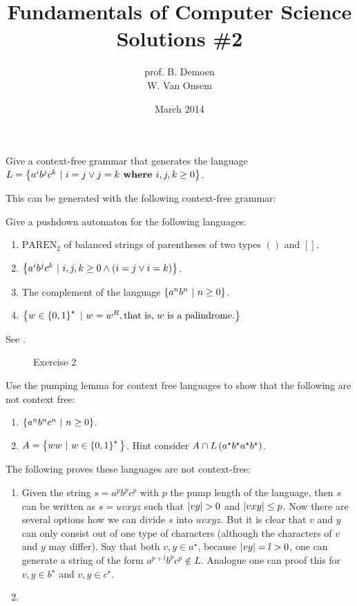 \documentclass{article}
\title{Fundamentals of Computer Science\\Solutions \#2}
\author{prof. B. Demoen\\W. Van Onsem}
\date{March 2014}
\begin{document}
\maketitle
\begin{exercise}
Give a context-free grammar that generates the language $L=\left\{ a^ib^jc^k\ |\ i=j\vee j=k \mbox{\bf{ where }} i,j,k\geq0 \right\}$.
\begin{answer}This can be generated with the following context-free grammar:
\end{answer}
\end{exercise}

\begin{exercise}
Give a pushdown automaton for the following languages:
\begin{enumerate}
 \item $\mbox{PAREN}_2$ of balanced strings of parentheses of two types $()$ and $[]$.
 \item $\left\{ a^ib^jc^k\ |\ i,j,k\geq0\wedge \left( i=j\vee i=k \right) \right\}$.
 \item The complement of the language $\left\{ a^nb^n\ |\ n\geq 0 \right\}$.
 \item $\left\{ w\in\left\{ 0,1 \right\}^{\star}\ |\ w=w^R, \mbox{that is, $w$ is a palindrome.} \right\}$
\end{enumerate}
\begin{answer}
See .
\begin{figure}[hbt]
\centering
{}
\caption{Exercise 2}
\end{figure}
\end{answer}
\end{exercise}

\begin{exercise}
Use the pumping lemma for context free languages to show that the following are not context free:
\begin{enumerate}
 \item $\left\{ a^nb^nc^n\ |\ n\geq0 \right\}$.
 \item $A=\left\{ ww\ |\ w\in\left\{ 0,1 \right\}^\star{} \right\}$. Hint consider $A\cap L\left( a^{\star}b^{\star}a^{\star}b^{\star} \right)$.
\end{enumerate}
\begin{answer}
The following proves these languages are not context-free:
\begin{enumerate}
 \item Given the string $s=a^pb^pc^p$ with $p$ the pump length of the language, then $s$ can be written as $s=uvxyz$ such that $\abs{vy}>0$ and $\left|vxy\right|\leq p$. Now there are several options how we can divide $s$ into $uvxyz$. But it is clear that $v$ and $y$ can only consist out of one type of characters (although the characters of $v$ and $y$ may differ). Say that both $v,y\in a^{\star}$, because $\left|vy\right|=l>0$, one can generate a string of the form $a^{p+l}b^pc^p\notin L$. Analogue one can proof this for $v,y\in b^{\star}$ and $v,y\in c^{\star}$.
 \item 
\end{enumerate}
\end{answer}
\end{exercise}
\end{document}
